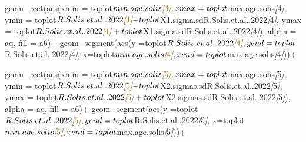 \documentclass[
]{article}
\newenvironment{Shaded}{\begin{snugshade}}{\end{snugshade}}
\newcommand{\CommentTok}[1]{\textcolor[rgb]{0.56,0.35,0.01}{\textit{#1}}}
\newcommand{\NormalTok}[1]{#1}
\newcommand{\OtherTok}[1]{\textcolor[rgb]{0.56,0.35,0.01}{#1}}
\begin{document}
\begin{Shaded}
\begin{Highlighting}[]
\NormalTok{  geom\_rect(aes(xmin = toplot$min.age.solis}\CommentTok{[}\OtherTok{4}\CommentTok{]}\NormalTok{, }
\NormalTok{                xmax = toplot$max.age.solis}\CommentTok{[}\OtherTok{4}\CommentTok{]}\NormalTok{, }
\NormalTok{                ymin = toplot$R.Solis.et.al..2022}\CommentTok{[}\OtherTok{4}\CommentTok{]}\NormalTok{{-}toplot$X1.sigma.sdR.Solis.et.al..2022}\CommentTok{[}\OtherTok{4}\CommentTok{]}\NormalTok{,}
\NormalTok{                ymax = toplot$R.Solis.et.al..2022}\CommentTok{[}\OtherTok{4}\CommentTok{]}\NormalTok{+toplot$X1.sigma.sdR.Solis.et.al..2022}\CommentTok{[}\OtherTok{4}\CommentTok{]}\NormalTok{),}
\NormalTok{            alpha = aq,}
\NormalTok{            fill = a6)+}
\NormalTok{  geom\_segment(aes(y =toplot$R.Solis.et.al..2022}\CommentTok{[}\OtherTok{4}\CommentTok{]}\NormalTok{,}
\NormalTok{                   yend =toplot$R.Solis.et.al..2022}\CommentTok{[}\OtherTok{4}\CommentTok{]}\NormalTok{,}
\NormalTok{                   x=toplot$min.age.solis}\CommentTok{[}\OtherTok{4}\CommentTok{]}\NormalTok{,}
\NormalTok{                   xend=toplot$max.age.solis}\CommentTok{[}\OtherTok{4}\CommentTok{]}\NormalTok{))+}
  
\NormalTok{  geom\_rect(aes(xmin = toplot$min.age.solis}\CommentTok{[}\OtherTok{5}\CommentTok{]}\NormalTok{, }
\NormalTok{                xmax = toplot$max.age.solis}\CommentTok{[}\OtherTok{5}\CommentTok{]}\NormalTok{, }
\NormalTok{                ymin = toplot$R.Solis.et.al..2022}\CommentTok{[}\OtherTok{5}\CommentTok{]}\NormalTok{{-}toplot$X2.sigmas.sdR.Solis.et.al..2022}\CommentTok{[}\OtherTok{5}\CommentTok{]}\NormalTok{,}
\NormalTok{                ymax = toplot$R.Solis.et.al..2022}\CommentTok{[}\OtherTok{5}\CommentTok{]}\NormalTok{+toplot$X2.sigmas.sdR.Solis.et.al..2022}\CommentTok{[}\OtherTok{5}\CommentTok{]}\NormalTok{),}
\NormalTok{            alpha = aq,}
\NormalTok{            fill = a6)+}
\NormalTok{  geom\_segment(aes(y =toplot$R.Solis.et.al..2022}\CommentTok{[}\OtherTok{5}\CommentTok{]}\NormalTok{,}
\NormalTok{                   yend =toplot$R.Solis.et.al..2022}\CommentTok{[}\OtherTok{5}\CommentTok{]}\NormalTok{,}
\NormalTok{                   x=toplot$min.age.solis}\CommentTok{[}\OtherTok{5}\CommentTok{]}\NormalTok{,}
\NormalTok{                   xend=toplot$max.age.solis}\CommentTok{[}\OtherTok{5}\CommentTok{]}\NormalTok{))+}
  

\end{Highlighting}
\end{Shaded}
\end{document}
